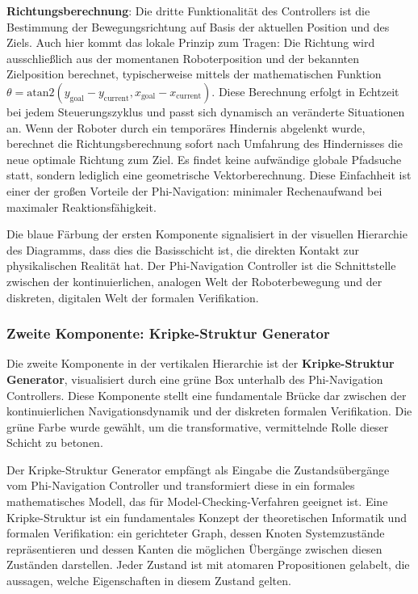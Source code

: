 ﻿\documentclass[a4paper,12pt]{article}
\theoremstyle{definition}
\begin{document}
\textbf{Richtungsberechnung}: Die dritte Funktionalität des Controllers ist die Bestimmung der Bewegungsrichtung auf Basis der aktuellen Position und des Ziels. Auch hier kommt das lokale Prinzip zum Tragen: Die Richtung wird ausschließlich aus der momentanen Roboterposition und der bekannten Zielposition berechnet, typischerweise mittels der mathematischen Funktion $\theta = \text{atan2}(y_{\text{goal}} - y_{\text{current}}, x_{\text{goal}} - x_{\text{current}})$. Diese Berechnung erfolgt in Echtzeit bei jedem Steuerungszyklus und passt sich dynamisch an veränderte Situationen an. Wenn der Roboter durch ein temporäres Hindernis abgelenkt wurde, berechnet die Richtungsberechnung sofort nach Umfahrung des Hindernisses die neue optimale Richtung zum Ziel. Es findet keine aufwändige globale Pfadsuche statt, sondern lediglich eine geometrische Vektorberechnung. Diese Einfachheit ist einer der großen Vorteile der Phi-Navigation: minimaler Rechenaufwand bei maximaler Reaktionsfähigkeit.

Die blaue Färbung der ersten Komponente signalisiert in der visuellen Hierarchie des Diagramms, dass dies die Basisschicht ist, die direkten Kontakt zur physikalischen Realität hat. Der Phi-Navigation Controller ist die Schnittstelle zwischen der kontinuierlichen, analogen Welt der Roboterbewegung und der diskreten, digitalen Welt der formalen Verifikation.

\subsubsection{Zweite Komponente: Kripke-Struktur Generator}

Die zweite Komponente in der vertikalen Hierarchie ist der \textbf{Kripke-Struktur Generator}, visualisiert durch eine grüne Box unterhalb des Phi-Navigation Controllers. Diese Komponente stellt eine fundamentale Brücke dar zwischen der kontinuierlichen Navigationsdynamik und der diskreten formalen Verifikation. Die grüne Farbe wurde gewählt, um die transformative, vermittelnde Rolle dieser Schicht zu betonen.

Der Kripke-Struktur Generator empfängt als Eingabe die Zustandsübergänge vom Phi-Navigation Controller und transformiert diese in ein formales mathematisches Modell, das für Model-Checking-Verfahren geeignet ist. Eine Kripke-Struktur ist ein fundamentales Konzept der theoretischen Informatik und formalen Verifikation: ein gerichteter Graph, dessen Knoten Systemzustände repräsentieren und dessen Kanten die möglichen Übergänge zwischen diesen Zuständen darstellen. Jeder Zustand ist mit atomaren Propositionen gelabelt, die aussagen, welche Eigenschaften in diesem Zustand gelten.
\end{document}
